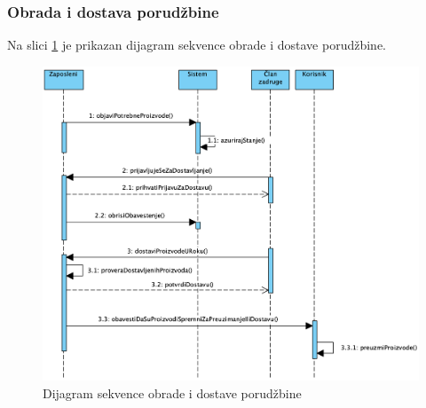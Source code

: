 \documentclass[a4paper, oneside]{article}
\begin{document}
\subsubsection{Obrada i dostava porudžbine}

Na slici \ref{dsekv_obrada_dostava} je prikazan dijagram sekvence obrade i dostave porudžbine.
\begin{figure}[h!]
    \centering
    \includegraphics[scale=0.6]{images/dsekv_obrada_dostava.png}
    \caption{Dijagram sekvence obrade i dostave porudžbine}
    \label{dsekv_obrada_dostava}
\end{figure}
\clearpage
\end{document}
